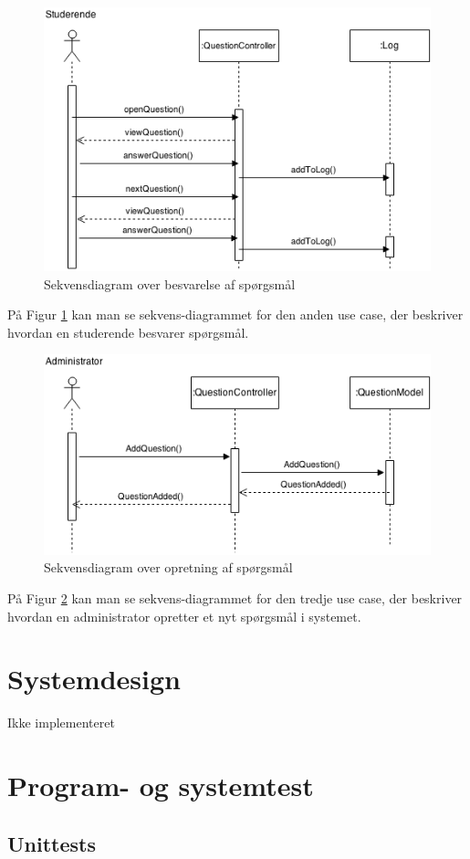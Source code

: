 \documentclass[12pt]{article}
\begin{document}
\begin{figure}[htpb]
    \centering
    \includegraphics[width=0.7\linewidth]{figures/SvarUseCase.png}
    \caption{Sekvensdiagram over besvarelse af spørgsmål}
    \label{fig:svar_sekvens}
\end{figure}
På Figur \ref{fig:svar_sekvens} kan man se sekvens-diagrammet for den anden use case, der beskriver hvordan en studerende besvarer spørgsmål.

\begin{figure}[htpb]
    \centering
    \includegraphics[width=0.7\linewidth]{figures/OpretSporgsmalUseCase.png}
    \caption{Sekvensdiagram over opretning af spørgsmål}
    \label{fig:opret_sp_sekvens}
\end{figure}
På Figur \ref{fig:opret_sp_sekvens} kan man se sekvens-diagrammet for den tredje use case, der beskriver hvordan en administrator opretter et nyt spørgsmål i systemet.

\section{Systemdesign}
\label{sec:systemdesign}
Ikke implementeret
\section{Program- og systemtest}
\label{sec:program_og_systemtest}
\subsection{Unittests}
\label{sub:unittests}
\end{document}
